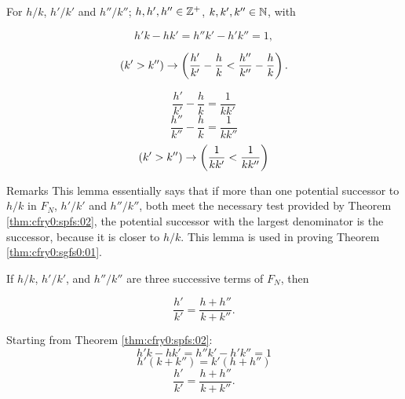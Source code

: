 \begin{vworklemmastatement}
\label{lem:cfry0:spfs:03b}
For $h/k$, $h'/k'$ and $h''/k''$; $h, h', h'' \in {\mathbb{Z}^+}$, 
$k, k', k'' \in {\mathbb{N}}$, with

\begin{equation}
h'k-hk' = h''k'-h'k''=1 ,
\end{equation}

\begin{equation}
(k'>k'') \to
\left( {
\frac{h'}{k'}-\frac{h}{k}<\frac{h''}{k''}-\frac{h}{k}
} \right) .
\end{equation}
\end{vworklemmastatement}
\begin{vworklemmaproof}
\begin{equation}
\frac{h'}{k'}-\frac{h}{k} = \frac{1}{kk'}
\end{equation}
\begin{equation}
\frac{h''}{k''}-\frac{h}{k} = \frac{1}{kk''}
\end{equation}
\begin{equation}
(k' > k'') \to \left( {
\frac{1}{kk'} < \frac{1}{kk''}
} \right)
\end{equation}
\end{vworklemmaproof}
\begin{vworklemmaparsection}{Remarks}
This lemma essentially says that if more than one potential successor to
$h/k$ in $F_N$, $h'/k'$ and $h''/k''$, both meet the necessary test
provided by Theorem \ref{thm:cfry0:spfs:02}, the potential successor
with the largest denominator is the successor, because it is closer to
$h/k$.  This lemma is used in proving Theorem \ref{thm:cfry0:sgfs0:01}.
\end{vworklemmaparsection}

\begin{vworktheoremstatement}
\label{thm:cfry0:spfs:03}
If $h/k$, $h'/k'$, and $h''/k''$ are three successive terms of $F_N$, then

\begin{equation}
\frac{h'}{k'} = \frac{h+h''}{k+k''}.
\end{equation}
\end{vworktheoremstatement}
\begin{vworktheoremproof}
Starting from Theorem \ref{thm:cfry0:spfs:02}:
\begin{equation}
h'k-hk' = h''k' - h'k''=1
\end{equation}
\begin{equation}
h'(k+k'')=k'(h+h'')
\end{equation}
\begin{equation}
\frac{h'}{k'} = \frac{h+h''}{k+k''}.
\end{equation}
\end{vworktheoremproof}
\vworktheoremfooter{}



